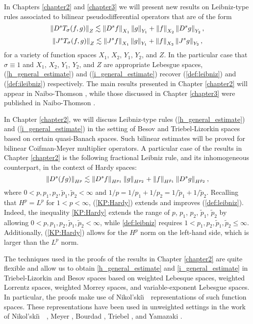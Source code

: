In Chapters \ref{chapter2} and \ref{chapter3} we will present new results on Leibniz-type rules associated to bilinear pseudodifferential operators that are of the form 
\begin{equation}\label{h_general_estimate}
\left\|D^s T_\sigma(f,g)\right\|_{Z} \lesssim \left\|D^sf\right\|_{X_1}\left\|g\right\|_{Y_1} + \left\|f\right\|_{X_2}\left\|D^s g\right\|_{Y_2} ,
\end{equation}
\begin{equation}\label{i_general_estimate}
\left\|J^sT_\sigma(f,g)\right\|_{Z} \lesssim \left\|J^sf\right\|_{X_1}\left\|g\right\|_{Y_1} + \left\|f\right\|_{X_2}\left\|J^sg\right\|_{Y_2} ,
\end{equation}
for a variety of function spaces $X_1$, $X_2$, $Y_1$, $Y_2$, and $Z$. In the particular case that $\sigma \equiv 1$ and $X_1$, $X_2$, $Y_1$, $Y_2$, and $Z$ are appropriate Lebesgue spaces, (\ref{h_general_estimate}) and (\ref{i_general_estimate}) recover (\ref{def:leibniz}) and (\ref{def:ileibniz}) respectively. The main results presented in Chapter \ref{chapter2} will appear in Naibo-Thomson \cite{NaTh_CM}, while those discussed in Chapter \ref{chapter3} were published in Naibo-Thomson \cite{MR3912862}.

In Chapter \ref{chapter2}, we will discuss Leibniz-type rules (\ref{h_general_estimate}) and (\ref{i_general_estimate}) in the setting of Besov and Triebel-Lizorkin spaces based on certain quasi-Banach spaces. Such bilinear estimates will be proved for bilinear Coifman-Meyer multiplier operators. A particular case of the results in Chapter \ref{chapter2} is the following fractional Leibniz rule, and its inhomogeneous counterpart, in the context of Hardy spaces:
\begin{equation}\label{KP:Hardy}
\left\|D^s(fg)\right\|_{H^p} \lesssim \left\|D^s f\right\|_{H^{p_1}} \left\|g\right\|_{H^{p_2}} +  \left\|f\right\|_{H^{\tilde{p}_1}}   \left\|D^s g\right\|_{H^{\tilde{p}_2}}, 
\end{equation}
where $0<p,p_1, p_2,\tilde{p}_1, \tilde{p}_2 <\infty$ and $1/p = 1/p_1 + 1/p_2 = 1/\tilde{p}_1 + 1/\tilde{p}_2$. Recalling that $H^p = L^p$ for $1<p<\infty$, (\ref{KP:Hardy}) extends and improves (\ref{def:leibniz}). Indeed, the inequality \eqref{KP:Hardy} extends the range of $p$, $p_1$, $p_2$, $\tilde{p}_1$, $\tilde{p}_2$ by allowing $0<p,p_1,p_2,\tilde{p}_1,\tilde{p}_2<\infty$, while \eqref{def:leibniz} requires $1<p_1,p_2,\tilde{p}_1, \tilde{p}_2\leq \infty$. Additionally, (\ref{KP:Hardy}) allows for the $H^p$ norm on the left-hand side, which is larger than the $L^p$ norm. 
  
The techniques used in the proofs of the results in Chapter \ref{chapter2} are quite flexible and allow us to obtain \eqref{h_general_estimate} and \eqref{i_general_estimate} in Triebel-Lizorkin and Besov spaces based on weighted Lebesque spaces, weighted Lorrentz spaces, weighted Morrey spaces, and variable-exponent Lebesgue spaces.
In particular, the proofs make use of Nikol'ski\u\i$\text{ }$  representations of such function spaces. These representations have been used in unweighted settings in the work of Nikol'ski\u\i$\text{ }$  \citep{MR0374877}, Meyer \citep{MR639462}, Bourdad \citep{MR673825}, Triebel \citep{MR3024598}, and Yamazaki \citep{MR837335}. 

